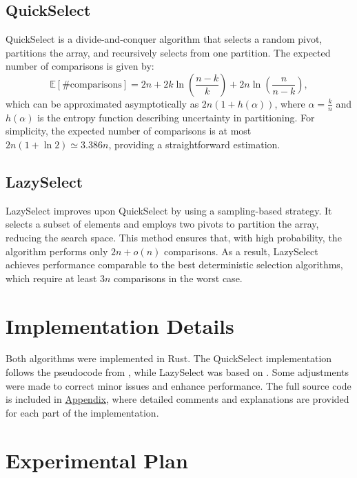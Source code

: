 \documentclass{article}
\begin{document}
\subsection{QuickSelect}

QuickSelect is a divide-and-conquer algorithm that selects a random pivot, partitions the array, and recursively selects from one partition. The expected number of comparisons is given by:
\[
\mathbb{E}[\text{\#comparisons}] = 2n + 2k \ln\left(\frac{n-k}{k}\right) + 2n \ln\left(\frac{n}{n-k}\right),
\]
which can be approximated asymptotically as \(2n(1 + h(\alpha))\), where \( \alpha = \frac{k}{n} \) and \( h(\alpha) \) is the entropy function describing uncertainty in partitioning. For simplicity, the expected number of comparisons is at most \(2n(1 + \ln{2}) \simeq 3.386n \), providing a straightforward estimation.



\subsection{LazySelect}

LazySelect improves upon QuickSelect by using a sampling-based strategy. It selects a subset of elements and employs two pivots to partition the array, reducing the search space. This method ensures that, with high probability, the algorithm performs only \(2n + o(n)\) comparisons. As a result, LazySelect achieves performance comparable to the best deterministic selection algorithms, which require at least \(3n\) comparisons in the worst case.



\section{Implementation Details}

Both algorithms were implemented in Rust. The QuickSelect implementation follows the pseudocode from \cite{wiki:QuickSelect}, while LazySelect was based on \cite{motwani1995randomized}. Some adjustments were made to correct minor issues and enhance performance. The full source code is included in \hyperref[appendix:code]{Appendix}, where detailed comments and explanations are provided for each part of the implementation.


\section{Experimental Plan}
\end{document}
